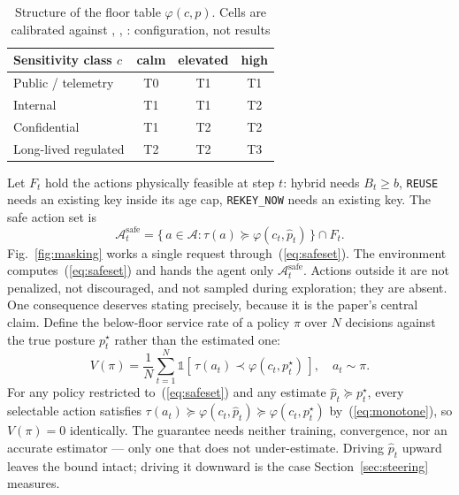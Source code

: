 \documentclass[conference]{IEEEtran}
\begin{document}
\begin{table}[htbp]
\caption{Structure of the floor table $\varphi(c,p)$. Cells are calibrated against \cite{ref2}, \cite{ref3}, \cite{ref20}: configuration, not results}
\label{tab:floor}
\centering
\begin{tabular}{@{}L{2.6cm}ccc@{}}
\toprule
Sensitivity class $c$ & calm & elevated & high \\
\midrule
Public / telemetry & T0 & T1 & T1 \\
Internal & T1 & T1 & T2 \\
Confidential & T1 & T2 & T2 \\
Long-lived regulated & T2 & T2 & T3 \\
\bottomrule
\end{tabular}
\end{table}

Let $F_t$ hold the actions physically feasible at step $t$: hybrid
needs $B_t \geq b$, \texttt{REUSE} needs an existing key inside its age
cap, \texttt{REKEY\_NOW} needs an existing key. The safe action set
is
\begin{equation}
\mathcal{A}^{\text{safe}}_t = \{\, a \in \mathcal{A} : \tau(a) \succeq \varphi(c_t, \hat{p}_t) \,\} \cap F_t.
\label{eq:safeset}
\end{equation}
Fig.~\ref{fig:masking} works a single request through~(\ref{eq:safeset}). The environment
computes~(\ref{eq:safeset}) and hands the agent only $\mathcal{A}^{\text{safe}}_t$. Actions outside
it are not penalized, not discouraged, and not sampled during
exploration; they are absent. One consequence deserves stating
precisely, because it is the paper's central claim. Define the
below-floor service rate of a policy $\pi$ over $N$ decisions against
the true posture $p^{\star}_t$ rather than the estimated one:
\begin{equation}
V(\pi) = \frac{1}{N} \sum_{t=1}^{N} \mathbb{1}\!\left[\, \tau(a_t) \prec \varphi(c_t, p^{\star}_t) \,\right], \quad a_t \sim \pi.
\label{eq:belowfloor}
\end{equation}
For any policy restricted to~(\ref{eq:safeset}) and any estimate $\hat{p}_t \succeq p^{\star}_t$,
every selectable action satisfies $\tau(a_t) \succeq \varphi(c_t, \hat{p}_t) \succeq \varphi(c_t, p^{\star}_t)$
by~(\ref{eq:monotone}), so $V(\pi) = 0$ identically. The guarantee needs neither
training, convergence, nor an accurate estimator --- only one
that does not under-estimate. Driving $\hat{p}_t$ upward leaves the
bound intact; driving it downward is the case Section~\ref{sec:steering} measures.
\end{document}
